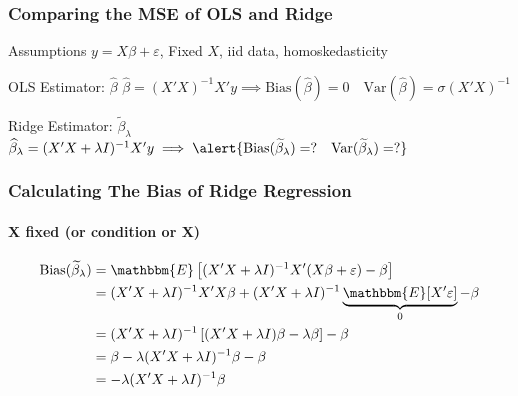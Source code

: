 \begin{frame}
  \frametitle{Comparing the MSE of OLS and Ridge}

  \begin{block}{Assumptions}
    $y = X\beta + \varepsilon$, Fixed $X$, iid data, homoskedasticity
  \end{block}

  \begin{block}{OLS Estimator: $\widehat{\beta}$} 
    $\widehat{\beta} = (X'X)^{-1}X'y \implies \text{Bias}(\widehat{\beta}) = 0 \quad \text{Var}(\widehat{\beta}) = \sigma (X'X)^{-1}$
  \end{block}

  \begin{block}{Ridge Estimator: $\widetilde{\beta}_\lambda$}
    $\widehat{\beta}_\lambda = (X'X + \lambda I)^{-1}X'y \implies \alert{\text{Bias}(\widetilde{\beta}_\lambda) = ? \quad\text{Var}(\widetilde{\beta}_\lambda) = ?}$ 
  \end{block}

\end{frame}
\begin{frame}
  \frametitle{Calculating The Bias of Ridge Regression}
  \framesubtitle{X fixed (or condition or X)}

  \begin{align*}
    \text{Bias}(\widetilde{\beta}_\lambda ) &= \mathbbm{E}\left[ (X'X + \lambda I)^{-1} X'(X\beta + \varepsilon) - \beta \right]\\
    &= (X'X + \lambda I)^{-1} X'X\beta  + (X'X + \lambda I)^{-1}\underbrace{\mathbbm{E}[X'\varepsilon]}_{0} - \beta\\
    &= (X'X + \lambda I)^{-1}\left[ (X'X + \lambda I)\beta - \lambda \beta \right] - \beta\\
    &= \beta - \lambda (X'X + \lambda I)^{-1} \beta - \beta\\
    &= - \lambda(X'X + \lambda I)^{-1} \beta
  \end{align*}

\end{frame}
